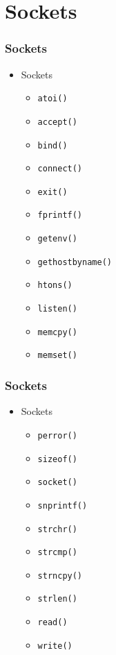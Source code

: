 \documentclass[aspectratio=169, xcolor=table, notheorems, hyperref={pdfpagelabels=false}]{beamer}
\begin{document}
\section{Sockets}
\begin{frame}
\frametitle{Sockets}
\begin{itemize}
\item Sockets
\begin{itemize}
\item \texttt{atoi()}
\item \texttt{accept()}
\item \texttt{bind()}
\item \texttt{connect()}
\item \texttt{exit()}
\item \texttt{fprintf()}
\item \texttt{getenv()}
\item \texttt{gethostbyname()}
\item \texttt{htons()}
\item \texttt{listen()}
\item \texttt{memcpy()}
\item \texttt{memset()}
\end{itemize}
\end{itemize}
\end{frame}

\begin{frame}
\frametitle{Sockets}
\begin{itemize}
\item Sockets
\begin{itemize}
\item \texttt{perror()}
\item \texttt{sizeof()}
\item \texttt{socket()}
\item \texttt{snprintf()}
\item \texttt{strchr()}
\item \texttt{strcmp()}
\item \texttt{strncpy()}
\item \texttt{strlen()}
\item \texttt{read()}
\item \texttt{write()}
\end{itemize}
\end{itemize}
\end{frame}

\end{document}
